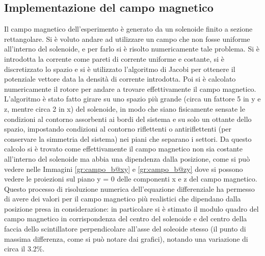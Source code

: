 \subsection{Implementazione del campo magnetico}
Il campo magnetico dell'esperimento è generato da un solenoide finito a sezione rettangolare. Si è voluto andare ad utilizzare un campo che non fosse uniforme all'interno
del solenoide, e per farlo si è risolto numericamente tale problema. Si è introdotta la corrente come pareti di corrente uniforme e costante, si è discretizzato lo spazio
e si è utilizzato l'algoritmo di Jacobi per ottenere il potenziale vettore data la densità di corrente introdotta. Poi si è calcolato numericamente il rotore per
andare a trovare effettivamente il campo magnetico. L'algoritmo è stato fatto girare su uno spazio più grande (circa un fattore 5 in y e z, mentre circa 2 in x) del solenoide, in modo che siano
fisicamente sensate le condizioni al contorno assorbenti ai bordi del sistema e su solo un ottante dello spazio, impostando condizioni al contorno riflettenti o antiriflettenti (per conservare la simmetria del sistema) nei piani che separano i settori. Da questo calcolo si è trovato come effettivamente il campo magnetico non sia costante
all'interno del solenoide ma abbia una dipendenza dalla posizione, come si può vedere nelle Immagini \ref{gr:campo_b@xy} e \ref{gr:campo_b@zy} dove si possono vedere le proiezioni sul piano y = 0 delle componenti x e z del campo magnetico. Questo processo di risoluzione numerica dell'equazione differenziale ha permesso di avere dei valori per il campo magnetico più realistici che dipendano dalla posizione presa in considerazione: in particolare si \`e stimato il modulo quadro del campo magnetico in corrispondenza del centro del solenoide e del centro della faccia dello scintillatore perpendicolare all'asse del soleoide stesso (il punto di massima differenza, come si pu\`o notare dai grafici), notando una variazione di circa il 3.2\%. 

